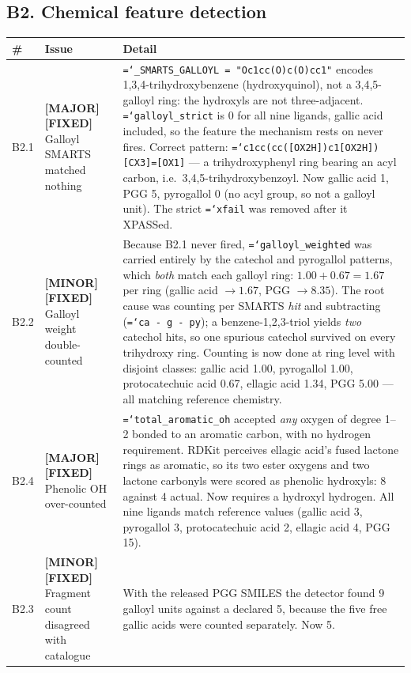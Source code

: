 \documentclass[11pt,a4paper]{article}
\newcommand{\ok}[1]{\textcolor{okgreen}{#1}}
\newcommand{\bad}[1]{\textcolor{badred}{#1}}
\newcommand{\warn}[1]{\textcolor{warnamber}{#1}}
\newcommand{\code}[1]{\texttt{\small\hyphenchar\font=`\-\relax #1}}
\newcommand{\SMAJOR}{\warn{\textbf{[MAJOR]}}}
\newcommand{\SMINOR}{\textbf{[MINOR]}}
\newcommand{\SFIXED}{\ok{\textbf{[FIXED]}}}
\begin{document}
\subsection{B2. Chemical feature detection}

\begin{longtable}{@{}L{0.6cm}L{5.2cm}L{8.6cm}@{}}
\toprule
\textbf{\#} & \textbf{Issue} & \textbf{Detail} \\
\midrule
\endhead
B2.1 & \SMAJOR{} \SFIXED{} Galloyl SMARTS matched nothing &
  \code{\_SMARTS\_GALLOYL = "Oc1cc(O)c(O)cc1"} encodes
  1,3,4-trihydroxybenzene (hydroxyquinol), not a 3,4,5-galloyl ring: the
  hydroxyls are not three-adjacent. \code{galloyl\_strict} is \bad{0 for all
  nine ligands, gallic acid included}, so the feature the mechanism rests on
  never fires. Correct pattern:
  \code{[OX2H]c1cc(cc([OX2H])c1[OX2H])[CX3]=[OX1]} --- a trihydroxyphenyl
  ring bearing an acyl carbon, i.e.\ 3,4,5-trihydroxybenzoyl. Now
  \ok{gallic acid 1, PGG 5, pyrogallol 0} (no acyl group, so not a galloyl
  unit). The strict \code{xfail} was removed after it XPASSed. \\
B2.2 & \SMINOR{} \SFIXED{} Galloyl weight double-counted &
  Because B2.1 never fired, \code{galloyl\_weighted} was carried entirely by
  the catechol and pyrogallol patterns, which \emph{both} match each galloyl
  ring: $1.00 + 0.67 = 1.67$ per ring (gallic acid $\to 1.67$, PGG
  $\to 8.35$). The root cause was counting per SMARTS \emph{hit} and
  subtracting (\code{ca - g - py}); a benzene-1,2,3-triol yields \emph{two}
  catechol hits, so one spurious catechol survived on every trihydroxy ring.
  Counting is now done at \ok{ring level with disjoint classes}: gallic acid
  1.00, pyrogallol 1.00, protocatechuic acid 0.67, ellagic acid 1.34,
  PGG 5.00 --- all matching reference chemistry. \\
B2.4 & \SMAJOR{} \SFIXED{} Phenolic OH over-counted &
  \code{total\_aromatic\_oh} accepted \emph{any} oxygen of degree 1--2 bonded
  to an aromatic carbon, with no hydrogen requirement. RDKit perceives
  ellagic acid's fused lactone rings as aromatic, so its two ester oxygens
  and two lactone carbonyls were scored as phenolic hydroxyls: \bad{8
  against 4 actual}. Now requires a hydroxyl hydrogen. All nine ligands match
  reference values (gallic acid 3, pyrogallol 3, protocatechuic acid 2,
  ellagic acid 4, PGG 15). \\
B2.3 & \SMINOR{} \SFIXED{} Fragment count disagreed with catalogue &
  With the released PGG SMILES the detector found \bad{9} galloyl units
  against a declared 5, because the five free gallic acids were counted
  separately. Now 5. \\
\bottomrule
\end{longtable}
\end{document}
